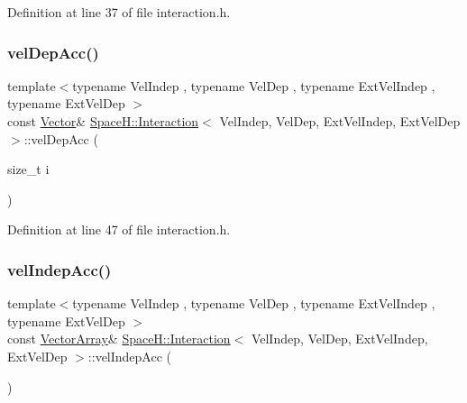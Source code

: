 Definition at line 37 of file interaction.\+h.

\mbox{\label{class_space_h_1_1_interaction_a4f4cf3f4d89514e15bf5f31bdf141a1d}} 
\subsubsection{\texorpdfstring{vel\+Dep\+Acc()}{velDepAcc()}\hspace{0.1cm}{\footnotesize\ttfamily [2/2]}}
{\footnotesize\ttfamily template$<$typename Vel\+Indep , typename Vel\+Dep , typename Ext\+Vel\+Indep , typename Ext\+Vel\+Dep $>$ \\
const \mbox{\hyperlink{class_space_h_1_1_interaction_ad6d656d30b9272a5f690b0412a4a9a86}{Vector}}\& \mbox{\hyperlink{class_space_h_1_1_interaction}{Space\+H\+::\+Interaction}}$<$ Vel\+Indep, Vel\+Dep, Ext\+Vel\+Indep, Ext\+Vel\+Dep $>$\+::vel\+Dep\+Acc (\begin{DoxyParamCaption}\item[{size\+\_\+t}]{i }\end{DoxyParamCaption})\hspace{0.3cm}{\ttfamily [inline]}}



Definition at line 47 of file interaction.\+h.

\mbox{\label{class_space_h_1_1_interaction_a5b5da26af45601a300ec9e0ad7fa2141}} 
\subsubsection{\texorpdfstring{vel\+Indep\+Acc()}{velIndepAcc()}\hspace{0.1cm}{\footnotesize\ttfamily [1/2]}}
{\footnotesize\ttfamily template$<$typename Vel\+Indep , typename Vel\+Dep , typename Ext\+Vel\+Indep , typename Ext\+Vel\+Dep $>$ \\
const \mbox{\hyperlink{class_space_h_1_1_interaction_a9aaccf9a34d875881d9448acf7aaf009}{Vector\+Array}}\& \mbox{\hyperlink{class_space_h_1_1_interaction}{Space\+H\+::\+Interaction}}$<$ Vel\+Indep, Vel\+Dep, Ext\+Vel\+Indep, Ext\+Vel\+Dep $>$\+::vel\+Indep\+Acc (\begin{DoxyParamCaption}{ }\end{DoxyParamCaption})\hspace{0.3cm}{\ttfamily [inline]}}



